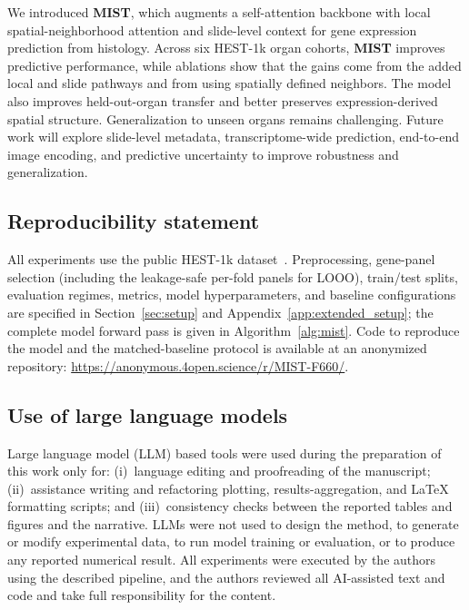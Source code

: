 \documentclass[11pt]{article}
\newcommand{\morph}{\textbf{MIST}}
\begin{document}
We introduced \morph{}, which augments a self-attention backbone with
local spatial-neighborhood attention and slide-level context for gene
expression prediction from histology. Across six HEST-1k organ cohorts,
\morph{} improves predictive performance, while ablations show that the gains
come from the added local and slide pathways and from using spatially defined
neighbors. The model also improves held-out-organ transfer and better preserves
expression-derived spatial structure. Generalization to unseen organs remains challenging. Future work will explore
slide-level metadata, transcriptome-wide prediction, end-to-end image encoding,
and predictive uncertainty to improve robustness and generalization.

\subsection*{Reproducibility statement}
All experiments use the public HEST-1k dataset~\cite{jaume2024hest}. Preprocessing, gene-panel
selection (including the leakage-safe per-fold panels for LOOO), train/test splits, evaluation
regimes, metrics, model hyperparameters, and baseline configurations are specified in
Section~\ref{sec:setup} and Appendix~\ref{app:extended_setup}; the complete model forward pass is
given in Algorithm~\ref{alg:mist}. Code to reproduce the model and the matched-baseline protocol is
available at an anonymized repository:
\url{https://anonymous.4open.science/r/MIST-F660/}.

\subsection*{Use of large language models}
Large language model (LLM) based tools were used during the preparation of this work only for:
(i)~language editing and proofreading of the manuscript; (ii)~assistance writing and refactoring
plotting, results-aggregation, and \LaTeX{} formatting scripts; and (iii)~consistency checks between
the reported tables and figures and the narrative. LLMs were not used to design the method, to
generate or modify experimental data, to run model training or evaluation, or to produce any reported
numerical result. All experiments were executed by the authors using the described pipeline, and the
authors reviewed all AI-assisted text and code and take full responsibility for the content.



\end{document}
